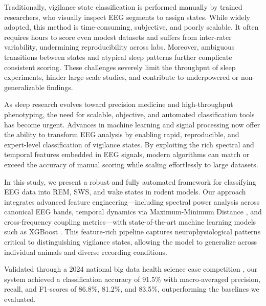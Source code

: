 \documentclass[letterpaper]{article} %
\begin{document}
Traditionally, vigilance state classification is performed manually by trained researchers, who visually inspect EEG segments to assign states. While widely adopted, this method is time-consuming, subjective, and poorly scalable. It often requires hours to score even modest datasets and suffers from inter-rater variability, undermining reproducibility across labs. Moreover, ambiguous transitions between states and atypical sleep patterns further complicate consistent scoring. These challenges severely limit the throughput of sleep experiments, hinder large-scale studies, and contribute to underpowered or non-generalizable findings.

As sleep research evolves toward precision medicine and high-throughput phenotyping, the need for scalable, objective, and automated classification tools has become urgent. Advances in machine learning and signal processing now offer the ability to transform EEG analysis by enabling rapid, reproducible, and expert-level classification of vigilance states. By exploiting the rich spectral and temporal features embedded in EEG signals, modern algorithms can match or exceed the accuracy of manual scoring while scaling effortlessly to large datasets.

In this study, we present a robust and fully automated framework for classifying EEG data into REM, SWS, and wake states in rodent models. Our approach integrates advanced feature engineering---including spectral power analysis across canonical EEG bands, temporal dynamics via Maximum-Minimum Distance \citep{e18090272}, and cross-frequency coupling metrics---with state-of-the-art machine learning models such as XGBoost \citep{Chen_2016}. This feature-rich pipeline captures neurophysiological patterns critical to distinguishing vigilance states, allowing the model to generalize across individual animals and diverse recording conditions.

Validated through a 2024 national big data health science case competition \citep{bdhsc2024case}, our system achieved a classification accuracy of 91.5\% with macro-averaged precision, recall, and F1-scores of 86.8\%, 81.2\%, and 83.5\%, outperforming the baselines we evaluated. %
\end{document}
